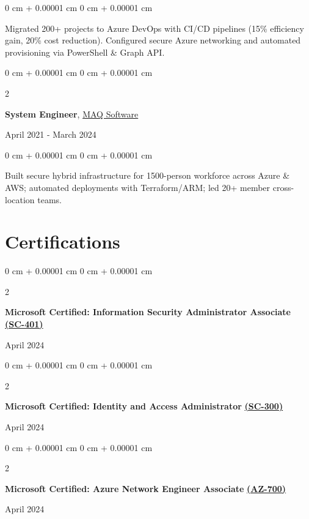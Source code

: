 \documentclass[10pt, letterpaper]{article}
\newenvironment{onecolentry}{
    \begin{adjustwidth}{
        0 cm + 0.00001 cm
    }{
        0 cm + 0.00001 cm
    }
}{
    \end{adjustwidth}
}
\newenvironment{twocolentry}[2][]{
    \onecolentry
    \def\secondColumn{#2}
    \setcolumnwidth{\fill, 4.5 cm}
    \begin{paracol}{2}
}{
    \switchcolumn \raggedleft \secondColumn
    \end{paracol}
    \endonecolentry
}
\begin{document}
\vspace{0.10 cm}
\begin{onecolentry}
    Migrated 200+ projects to Azure DevOps with CI/CD pipelines (15\% efficiency gain, 20\% cost reduction). Configured secure Azure networking and automated provisioning via PowerShell \& Graph API.
\end{onecolentry}

\vspace{0.2 cm}

\begin{twocolentry}{April 2021 - March 2024}
    \textbf{System Engineer}, \href{https://maqsoftware.com/}{MAQ Software}
\end{twocolentry}

\vspace{0.10 cm}
\begin{onecolentry}
    Built secure hybrid infrastructure for 1500-person workforce across Azure \& AWS; automated deployments with Terraform/ARM; led 20+ member cross-location teams.
\end{onecolentry}

\section{Certifications}

\vspace{0.2 cm}

\begin{twocolentry}{April 2024}
    \textbf{Microsoft Certified: Information Security Administrator Associate} \href{https://learn.microsoft.com/api/credentials/share/en-in/ChinmayDhokMAQSoftware-5822/175A9EF2AB5B5B56?sharingId=BC2982D57159EF1A}{\textbf{(SC-401)}}
\end{twocolentry}

\vspace{0.05 cm}
\begin{twocolentry}{April 2024}
    \textbf{Microsoft Certified: Identity and Access Administrator} \href{https://learn.microsoft.com/en-us/users/chinmaydhokmaqsoftware-5822/credentials/82be0c3d23d052b8}{\textbf{(SC-300)}}
\end{twocolentry}

\vspace{0.05 cm}
\begin{twocolentry}{April 2024}
    \textbf{Microsoft Certified: Azure Network Engineer Associate} \href{https://learn.microsoft.com/en-us/users/ChinmayDhokMAQSoftware-5822/credentials/4244163FEBBEDDAF}{\textbf{(AZ-700)}}
\end{twocolentry}
\end{document}
